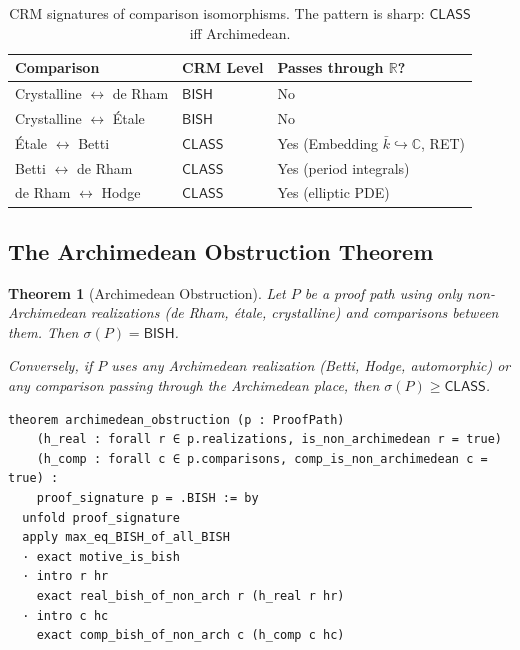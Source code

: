 \documentclass[11pt,a4paper]{article}
\theoremstyle{plain}
\newtheorem{theorem}{Theorem}[section]
\theoremstyle{definition}
\newcommand{\BISH}{\textsf{BISH}}
\newcommand{\CLASS}{\textsf{CLASS}}
\newcommand{\sig}{\sigma}
\newcommand{\R}{\mathbb{R}}
\newcommand{\C}{\mathbb{C}}
\begin{document}
\begin{table}[h]
\centering
\begin{tabular}{@{}lll@{}}
\toprule
\textbf{Comparison} & \textbf{CRM Level} & \textbf{Passes through $\R$?} \\
\midrule
Crystalline $\leftrightarrow$ de Rham & $\BISH$ & No \\
Crystalline $\leftrightarrow$ \'Etale & $\BISH$ & No \\
\'Etale $\leftrightarrow$ Betti & $\CLASS$ & Yes (Embedding $\bar{k} \hookrightarrow \C$, RET) \\
Betti $\leftrightarrow$ de Rham & $\CLASS$ & Yes (period integrals) \\
de Rham $\leftrightarrow$ Hodge & $\CLASS$ & Yes (elliptic PDE) \\
\bottomrule
\end{tabular}
\caption{CRM signatures of comparison isomorphisms. The pattern is sharp: $\CLASS$ iff Archimedean.}
\label{tab:comparisons}
\end{table}

\subsection{The Archimedean Obstruction Theorem}

\begin{theorem}[Archimedean Obstruction]\label{thm:archimedean}
Let $P$ be a proof path using only non-Archimedean realizations (de Rham, \'etale, crystalline) and comparisons between them. Then $\sig(P) = \BISH$.

Conversely, if $P$ uses any Archimedean realization (Betti, Hodge, automorphic) or any comparison passing through the Archimedean place, then $\sig(P) \geq \CLASS$.
\end{theorem}

\begin{tcolorbox}[leanbox={Lean: Archimedean Obstruction}]
\begin{Verbatim}[fontsize=\small]
theorem archimedean_obstruction (p : ProofPath) 
    (h_real : forall r ∈ p.realizations, is_non_archimedean r = true)
    (h_comp : forall c ∈ p.comparisons, comp_is_non_archimedean c = true) :
    proof_signature p = .BISH := by
  unfold proof_signature
  apply max_eq_BISH_of_all_BISH
  · exact motive_is_bish
  · intro r hr
    exact real_bish_of_non_arch r (h_real r hr)
  · intro c hc
    exact comp_bish_of_non_arch c (h_comp c hc)
\end{Verbatim}
\end{tcolorbox}
\end{document}
